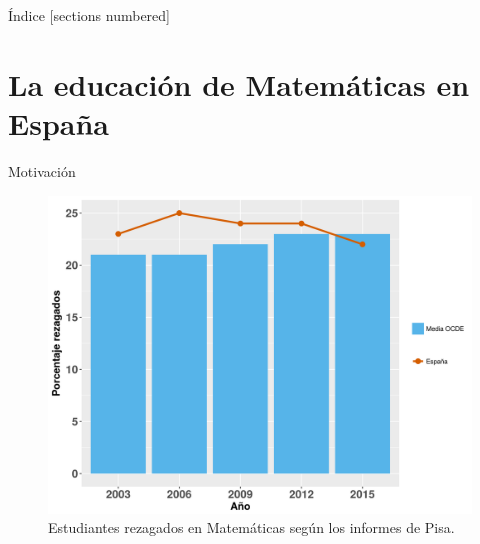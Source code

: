 \documentclass[10pt,notes,compress,usetitleprogressbar,aspectratio=1610]{beamer}
\title{\titulo}
\subtitle{\TFM}
\author{Víctor de Juan Sanz}
\date{Julio 2017}
\institute{}
\begin{document}
\maketitle

\begin{frame}{Índice}
	[sections numbered]
	\tableofcontents[hideallsubsections]
\end{frame}


\section{La educación de Matemáticas en España}
\note{}

\begin{frame}{Motivación}
	\begin{figure}
		\centering
		\includegraphics[scale=0.4]{../img/PisaRezagados.png}
		\caption{Estudiantes rezagados en Matemáticas según los informes de Pisa.}
	\end{figure}
\end{frame}
\end{document}

